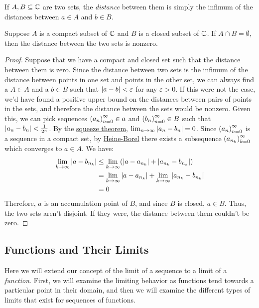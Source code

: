 \begin{definition}
If $A, B \subseteq \mathbb{C}$ are two sets, the \emph{distance} between them is simply the infimum of the distances between $a \in A$ and $b \in B$.
\end{definition}
\begin{theorem}
Suppose $A$ is a compact subset of $\mathbb{C}$ and $B$ is a closed subset of $\mathbb{C}$. If $A \cap B = \emptyset$, then the distance between the two sets is nonzero.
\end{theorem}
\begin{proof}
Suppose that we have a compact and closed set such that the distance between them is zero. Since the distance between two sets is the infimum of the distance between points in one set and points in the other set, we can always find a $A \in A$ and a $b \in B$ such that $\left\lvert a-b \right\rvert < \varepsilon$ for any $\varepsilon > 0$. If this were not the case, we'd have found a positive upper bound on the distances between pairs of points in the sets, and therefore the distance between the sets would be nonzero. Given this, we can pick sequences $\seq{a} \in a$ and $\seq{b} \in B$ such that $\left\lvert a_n - b_n \right\rvert < \frac{1}{2^n}$. By the \hyperlink{Squeeze Theorem}{squeeze theorem}, $\lim_{n\to\infty}\left\lvert a_n -b_n \right\rvert = 0$. Since $\seq{a}$ is a sequence in a compact set, by \hyperlink{Heine-Borel Theorem}{Heine-Borel} there exists a subsequence $\seq{a}[n_k][k]$ which converges to $a \in A$. We have:
\begin{align*}
\lim_{k\to\infty}\left\lvert a-b_{n_k} \right\rvert &\leq \lim_{k\to\infty}(\left\lvert a-a_{n_k} \right\rvert + \left\lvert a_{n_k} - b_{n_k} \right\rvert)\\
&= \lim_{k\to\infty}\left\lvert a-a_{n_k} \right\rvert + \lim_{k\to\infty}\left\lvert a_{n_k}-b_{n_k} \right\rvert\\
&= 0
\end{align*}
Therefore, $a$ is an accumulation point of $B$, and since $B$ is closed, $a\in B$. Thus, the two sets aren't disjoint. If they were, the distance between them couldn't be zero.
\end{proof}
\subsection{Functions and Their Limits}
Here we will extend our concept of the limit of a sequence to a limit of a \emph{function}. First, we will examine the limiting behavior as functions tend towards a particular point in their domain, and then we will examine the different types of limits that exist for sequences of functions.

